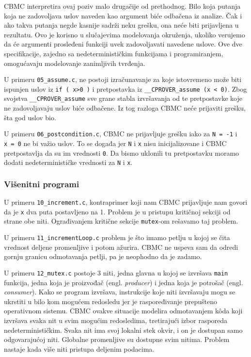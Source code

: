 CBMC interpretira ovaj poziv malo drugačije od prethodnog. Bilo koja putanja koja ne zadovoljava uslov naveden kao argument biće odbačena iz analize. Čak i ako takva putanja negde kasnije sadrži neku grešku, ona neće biti prijavljena u rezultatu. Ovo je korisno u slučajevima modelovanja okruženja, ukoliko verujemo da će argumenti prosleđeni funkciji uvek zadovoljavati navedene uslove. Ove dve specifikacije, zajedno sa nedeterminističkim funkcijama i programiranjem, omogućavaju modelovanje zanimljivih tvrđenja.

U primeru \texttt{05\_assume.c}, ne postoji izračunavanje za koje istovremeno može biti ispunjen uslov iz \texttt{if\ (\ x\textgreater{}0\ )} i pretpostavka iz \texttt{\_\_CPROVER\_assume\ (x\ \textless{}\ 0)}. Zbog svojstva \texttt{\_\_CPROVER\_assume} sve grane stabla izvršavanja od te pretpostavke koje ne zadovoljavaju uslov biće odbačene. Iz tog razloga CBMC neće prijaviti grešku, šta god uslov bio.

U primeru \texttt{06\_postcondition.c}, CBMC ne prijavljuje grešku iako za \texttt{N\ =\ -1} i \texttt{x\ =\ 0} ne bi važio uslov. To se događa jer \texttt{N} i \texttt{x} nisu inicijalizovane i CBMC pretpostavlja da su im vrednosti \texttt{0}. Da bismo uklonili tu pretpostavku moramo dodati nedeterminističke vrednosti za \texttt{N} i \texttt{x}.

\subsubsection{Višenitni programi}\label{viux161enitni-programi}

U primeru \texttt{10\_increment.c}, kontraprimer koji nam CBMC prijavljuje nam govori da je \texttt{x} dva puta postavljeno na 1. Problem je u pristupu kritičnoj sekciji od strane obe niti. Ograđivanjem kritične sekcije \texttt{mutex}-om rešavamo taj problem.

U primeru \texttt{11\_incrementLoop.c} problem je što imamo petlju u kojoj se čita vrednost deljene promenljive i potom ažurira. CBMC ne uspeva sam da odredi gornju granicu odmotavanja petlji, pa je neophodno da je zadamo.

U primeru \texttt{12\_mutex.c} postoje 3 niti, jedna glavna u kojoj se izvršava \texttt{main} funkcija, jedna koja je proizvođač (engl. \emph{producer}) i jedna koja je potrošač (engl. \emph{consumer}). Kako se program izvršava, instrukcije koje niti izvršavaju mogu se ukrstiti u bilo kom mogućem redosledu jer je raspoređivanje prepušteno operativnom sistemu. CBMC ovakve situacije modelira odmotavanjem kôda koji izvršava svaka nit u svim mogućim redosledima, tretirajući izbor rasporeda nedeterminističkim. Svaka nit ima svoj lokalni stek okvir, i on je dostupan samo odgovarajućoj niti. Globalne promenljive su dostupne svim nitima. Problem nastaje kada više niti pristupa deljenim podacima.

